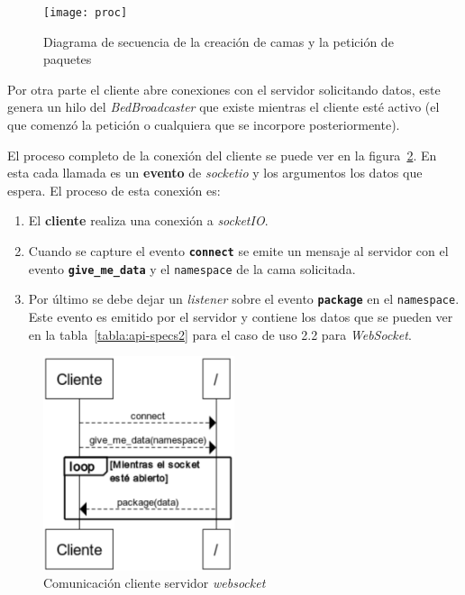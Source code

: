 \begin{figure}
	\centering
	\texttt{[image: proc]}
	\caption{Diagrama de secuencia de la creación de camas y la petición de paquetes}
	\label{fig:proc_sec}
\end{figure}

Por otra parte el cliente abre conexiones con el servidor solicitando datos, este genera un hilo del \textit{BedBroadcaster} que existe mientras el cliente esté activo (el que comenzó la petición o cualquiera que se incorpore posteriormente). 

El proceso completo de la conexión del cliente se puede ver en la figura~\ref{fig:ws-secuence}. En esta cada llamada es un \textbf{evento} de \textit{socketio} y los argumentos los datos que espera. El proceso de esta conexión es:
\begin{enumerate}
	\item El \textbf{cliente} realiza una conexión a \textit{socketIO}.
	\item Cuando se capture el evento \texttt{\textbf{connect}} se emite un mensaje al servidor con el evento \texttt{\textbf{give\_me\_data}} y el \texttt{namespace} de la cama solicitada.
	\item Por último se debe dejar un \textit{listener} sobre el evento \texttt{\textbf{package}} en el \texttt{namespace}. Este evento es emitido por el servidor y contiene los datos que se pueden ver en la tabla~\ref{tabla:api-specs2} para el caso de uso 2.2 para \textit{WebSocket}.
\end{enumerate}

\begin{figure}
	\centering
	\includegraphics[width=0.5\textwidth]{img/ws-secuence.png}
	\caption{Comunicación cliente servidor \textit{websocket}}
	\label{fig:ws-secuence}
\end{figure}

